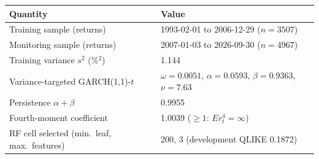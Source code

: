 \begin{tabular}{ll}
\toprule
Quantity & Value \\
\midrule
Training sample (returns) & 1993-02-01 to 2006-12-29 ($n=3507$) \\
Monitoring sample (returns) & 2007-01-03 to 2026-09-30 ($n=4967$) \\
Training variance $s^2$ (\%$^2$) & 1.144 \\
Variance-targeted GARCH(1,1)-$t$ & $\omega=0.0051$, $\alpha=0.0593$, $\beta=0.9363$, $\nu=7.63$ \\
Persistence $\alpha+\beta$ & 0.9955 \\
Fourth-moment coefficient & 1.0039 ($\geq 1$: $E r_t^4=\infty$) \\
RF cell selected (min.\ leaf, max.\ features) & 200, 3 (development QLIKE 0.1872) \\
\bottomrule
\end{tabular}
